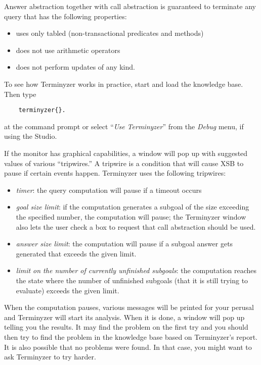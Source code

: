 Answer abstraction together with call abstraction is guaranteed to
terminate any query that has the following properties:
\begin{itemize}
\item  uses only tabled (non-transactional predicates and methods)
\item  does not use arithmetic operators
\item  does not perform updates of any kind.
\end{itemize}

\noindent
To see how Terminyzer works in practice, start \ERGO and load the knowledge
base. Then type
\begin{verbatim}
    terminyzer{}.
\end{verbatim}
at the command prompt or select ``\emph{Use Terminyzer}'' 
from the \emph{Debug} menu, if using the Studio. 

If the monitor has graphical capabilities,
a window will pop up with suggested values of various ``tripwires.''
A tripwire is a condition that will cause XSB to pause if certain events happen.
Terminyzer uses the following tripwires:
\begin{itemize}
\item  \emph{timer}: the query computation will pause if a timeout occurs
\item  \emph{goal size limit}: if the computation generates a subgoal of
  the size exceeding the specified  number, the computation will pause;
  the Terminyzer window also lets the user check a box to request that call
  abstraction should be used.
\item  \emph{answer size limit}: the computation will pause if a subgoal
  answer gets generated that exceeds the given limit.
\item  \emph{limit on the number of currently unfinished subgoals}:
  the computation reaches the state where the number of unfinished subgoals
  (that it is still trying to evaluate) exceeds the given limit.
\end{itemize}
When the computation pauses, various messages will be printed for your
perusal and Terminyzer will start its analysis. When it is done, a window
will pop up telling you the results. It may find the problem on the first try
and you should then try to find the problem in the knowledge base based on
Terminyzer's report.  It is also possible that no problems were found.
In that case, you might want to ask Terminyzer to try harder.

